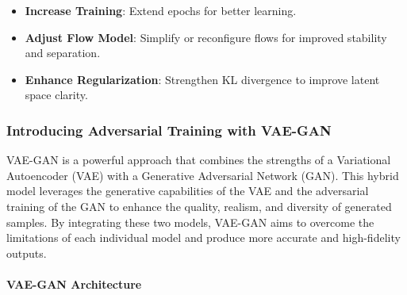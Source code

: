 \documentclass[11pt]{article}
\providecommand{\tightlist}{%
      \setlength{\itemsep}{0pt}\setlength{\parskip}{0pt}}
\begin{document}
\begin{itemize}
\tightlist
\item
  \textbf{Increase Training}: Extend epochs for better learning.
\item
  \textbf{Adjust Flow Model}: Simplify or reconfigure flows for improved
  stability and separation.
\item
  \textbf{Enhance Regularization}: Strengthen KL divergence to improve
  latent space clarity.
\end{itemize}

    \subsubsection{Introducing Adversarial Training with
VAE-GAN}\label{introducing-adversarial-training-with-vae-gan}

VAE-GAN is a powerful approach that combines the strengths of a
Variational Autoencoder (VAE) with a Generative Adversarial Network
(GAN). This hybrid model leverages the generative capabilities of the
VAE and the adversarial training of the GAN to enhance the quality,
realism, and diversity of generated samples. By integrating these two
models, VAE-GAN aims to overcome the limitations of each individual
model and produce more accurate and high-fidelity outputs.

\paragraph{VAE-GAN Architecture}\label{vae-gan-architecture}
\end{document}
